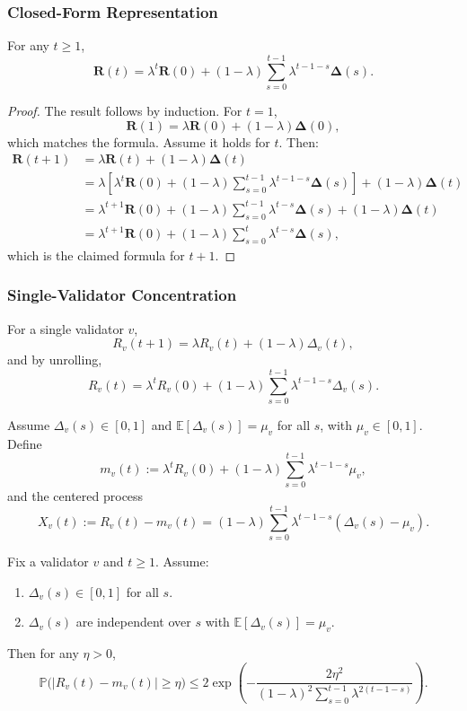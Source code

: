 \documentclass[11pt]{article}
\begin{document}
\subsubsection{Closed-Form Representation}

\begin{lemma}
\label{lem:ewma-unroll-app}
For any \(t \ge 1\),
\[
\bm{R}(t)
= \lambda^t \bm{R}(0)
  + (1-\lambda)\sum_{s=0}^{t-1} \lambda^{t-1-s}\bm{\Delta}(s).
\]
\end{lemma}

\begin{proof}
The result follows by induction. For \(t=1\),
\[
\bm{R}(1) = \lambda \bm{R}(0) + (1-\lambda)\bm{\Delta}(0),
\]
which matches the formula. Assume it holds for \(t\). Then:
\[
\begin{aligned}
\bm{R}(t+1)
&= \lambda \bm{R}(t) + (1-\lambda)\bm{\Delta}(t) \\
&= \lambda\left[
  \lambda^t \bm{R}(0)
  + (1-\lambda)\sum_{s=0}^{t-1}\lambda^{t-1-s}\bm{\Delta}(s)
\right]
+ (1-\lambda)\bm{\Delta}(t) \\
&= \lambda^{t+1}\bm{R}(0)
  + (1-\lambda)\sum_{s=0}^{t-1}\lambda^{t-s}\bm{\Delta}(s)
  + (1-\lambda)\bm{\Delta}(t) \\
&= \lambda^{t+1}\bm{R}(0)
  + (1-\lambda)\sum_{s=0}^{t}\lambda^{t-s}\bm{\Delta}(s),
\end{aligned}
\]
which is the claimed formula for \(t+1\).
\end{proof}

\subsubsection{Single-Validator Concentration}

For a single validator \(v\),
\[
R_v(t+1) = \lambda R_v(t) + (1-\lambda)\Delta_v(t),
\]
and by unrolling,
\[
R_v(t)
= \lambda^t R_v(0)
  + (1-\lambda)\sum_{s=0}^{t-1}\lambda^{t-1-s}\Delta_v(s).
\]

Assume \(\Delta_v(s)\in[0,1]\) and \(\mathbb{E}[\Delta_v(s)] = \mu_v\) for all \(s\), with \(\mu_v\in[0,1]\). Define
\[
m_v(t)
:= \lambda^t R_v(0)
  + (1-\lambda)\sum_{s=0}^{t-1}\lambda^{t-1-s}\mu_v,
\]
and the centered process
\[
X_v(t)
:= R_v(t) - m_v(t)
= (1-\lambda)\sum_{s=0}^{t-1}\lambda^{t-1-s}(\Delta_v(s) - \mu_v).
\]

\begin{lemma}
\label{lem:ewma-conc-app}
Fix a validator \(v\) and \(t \ge 1\). Assume:
\begin{enumerate}[leftmargin=*]
  \item \(\Delta_v(s) \in [0,1]\) for all \(s\).
  \item \(\Delta_v(s)\) are independent over \(s\) with \(\mathbb{E}[\Delta_v(s)] = \mu_v\).
\end{enumerate}
Then for any \(\eta > 0\),
\[
\mathbb{P}\big(|R_v(t) - m_v(t)| \ge \eta\big)
\le 2 \exp\!\left(
  -\frac{2\eta^2}{(1-\lambda)^2\sum_{s=0}^{t-1}\lambda^{2(t-1-s)}}
\right).
\]
\end{lemma}
\end{document}
